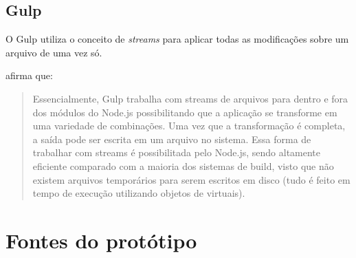 \section{Gulp}

O Gulp utiliza o conceito de \textit{streams} para aplicar todas as
modificações sobre um arquivo de uma vez só.

\citet{crossPlatformMobileGame} afirma que:
\begin{quote}
Essencialmente, Gulp trabalha com streams de arquivos para dentro e fora
dos módulos do Node.js possibilitando que a aplicação se transforme
em uma variedade de combinações. Uma vez que a transformação é
completa, a saída pode ser escrita em um arquivo no sistema. Essa forma
de trabalhar com streams é possibilitada pelo Node.js, sendo altamente
eficiente comparado com a maioria dos sistemas de build, visto que não
existem arquivos temporários para serem escritos em disco (tudo é
feito em tempo de execução utilizando objetos de virtuais).
\end{quote}

\chapter{Fontes do protótipo}


